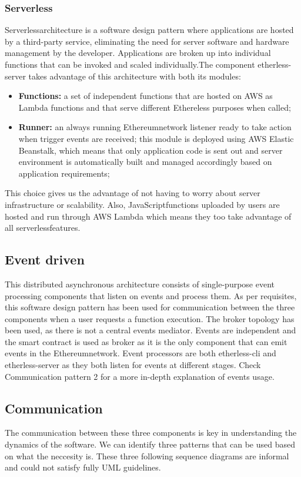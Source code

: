 \subsubsection{Serverless}
Serverless\glo architecture is a software design pattern where applications are hosted by a third-party service, eliminating the need for server software and hardware management by the developer. Applications are broken up into individual functions that can be invoked and scaled individually.\newline\newline The component etherless-server takes advantage of this architecture with both its modules:
\begin{itemize}
	\item \textbf{Functions:} a set of independent functions that are hosted on AWS as Lambda functions and that serve different Ethereless purposes when called;
	\item \textbf{Runner:} an always running Ethereum\glo network listener ready to take action when trigger events are received; this module is deployed using AWS Elastic Beanstalk, which means that only application code is sent out and server environment is automatically built and managed accordingly based on application requirements;
\end{itemize}
This choice gives us the advantage of not having to worry about server infrastructure or scalability.
Also, JavaScript\glo functions uploaded by users are hosted and run through AWS Lambda which means they too take advantage of all serverless\glo features.
\subsection{Event driven}
This distributed asynchronous architecture consists of single-purpose event processing components that listen on events and process them.\newline
As per requisites, this software design pattern has been used for communication between the three components when a user requests a function execution. The broker topology has been used, as there is not a central events mediator. Events are independent and the smart contract is used as broker as it is the only component that can emit events in the Ethereum\glo network. Event processors are both etherless-cli and etherless-server as they both listen for events at different stages. Check Communication pattern 2 for a more in-depth explanation of events usage.
\newpage
\subsection{Communication}
The communication between these three components is key in understanding the dynamics of the software. We can identify three patterns that can be used based on what the neccesity is.
These three following sequence diagrams are informal and could not satisfy fully UML guidelines.
